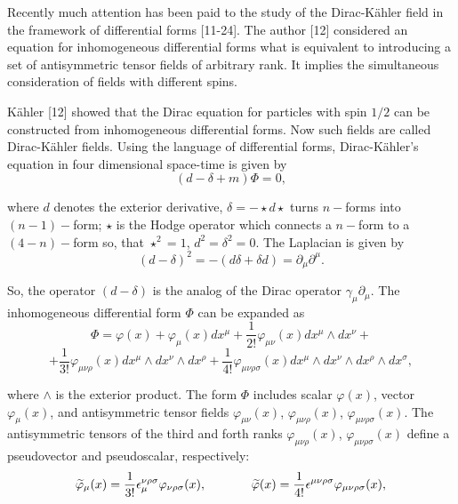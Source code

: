 \documentclass[a4paper,12pt]{article}
\begin{document}
Recently much attention has been paid to the study of the Dirac-K\"ahler
field in the framework of differential forms [11-24]. The author [12]
considered an equation for inhomogeneous differential forms what is
equivalent to introducing a set of antisymmetric tensor fields of arbitrary
rank. It implies the simultaneous consideration of fields with different
spins.

K\"ahler [12] showed that the Dirac equation for particles with spin $1/2$
can be constructed from inhomogeneous differential forms. Now such fields
are called Dirac-K\"ahler fields. Using the language of differential forms,
Dirac-K\"ahler's equation in four dimensional space-time is given by
\begin{equation}
\left( d-\delta +m\right) \Phi =0 ,  \label{1}
\end{equation}

where $d$ denotes the exterior derivative, $\delta =-\star d\star
$ turns $ n- $forms into $(n-1)-$form; $\star $ is the Hodge
operator which connects a $n- $form to a $(4-n)-$form so, that
$\star ^2=1$, $d^2=\delta ^2=0$. The Laplacian is given by
\[
\left( d-\delta \right) ^2=-\left( d\delta +\delta d\right)
=\partial _\mu \partial ^\mu .
\]

So, the operator $\left( d-\delta \right) $ is the analog of the
Dirac operator $\gamma _\mu \partial _\mu $. The inhomogeneous
differential form $ \Phi $ can be expanded as
\[
\Phi =\varphi (x)+\varphi _\mu (x)dx^\mu +\frac 1{2!}\varphi _{\mu \nu
}(x)dx^\mu \wedge dx^\nu +
\]
\vspace{-8mm}
\begin{equation}  \label{2}
\end{equation}
\vspace{-8mm}
\[
+\frac 1{3!}\varphi _{\mu \nu \rho }(x)dx^\mu \wedge dx^\nu \wedge
dx^\rho +\frac 1{4!}\varphi _{\mu \nu \rho \sigma }(x)dx^\mu
\wedge dx^\nu \wedge dx^\rho \wedge dx^\sigma ,
\]

where $\wedge $ is the exterior product. The form $\Phi $ includes
scalar $ \varphi (x)$, vector $\varphi _\mu (x)$, and
antisymmetric tensor fields $ \varphi _{\mu \nu }(x)$, $\varphi
_{\mu \nu \rho }(x)$, $\varphi _{\mu \nu \rho \sigma }(x)$. The
antisymmetric tensors of the third and forth ranks $ \varphi _{\mu
\nu \rho }(x)$, $\varphi _{\mu \nu \rho \sigma }(x)$ define a
pseudovector and pseudoscalar, respectively:
\begin{equation}
\widetilde{\varphi }_\mu (x)=\frac 1{3!}\epsilon _\mu ^{\nu \rho
\sigma }\varphi _{\nu \rho \sigma
}(x),\hspace{0.5in}\widetilde{\varphi }(x)=\frac 1{4!}\epsilon
^{\mu \nu \rho \sigma }\varphi _{\mu \nu \rho \sigma }(x) ,
\label{3}
\end{equation}
\end{document}
